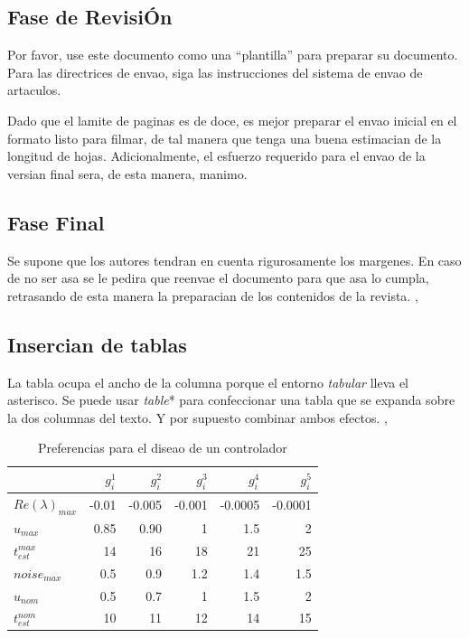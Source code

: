 \documentclass[5p,times,authoryear]{elsarticle}
\begin{document}
\subsection{Fase de RevisiÓn}

Por favor, use este documento como una ``plantilla'' para preparar su documento. Para las directrices de envao, siga las instrucciones del sistema de envao de artaculos.

Dado que el lamite de paginas es de doce, es mejor preparar el envao inicial en el formato listo para filmar, de tal manera que tenga una buena estimacian de la longitud de hojas. Adicionalmente, el esfuerzo requerido para el envao de la versian final sera, de esta manera, manimo.

\subsection{Fase Final}

Se supone que los autores tendran en cuenta rigurosamente los margenes. En caso de no ser asa se le pedira que reenvae el documento para que asa lo cumpla, retrasando de esta manera la preparacian de los contenidos de la revista. \citep{Bak:63a}, \citep{Bak:63b}

\subsection{Insercian de tablas}

La tabla ocupa el ancho de la columna porque el entorno \emph{tabular} lleva el asterisco. Se puede usar \emph{table}* para confeccionar una tabla que se expanda sobre la dos columnas del texto. Y por supuesto combinar ambos efectos. \citep{Heritage:92}, \citep{ChaRou:66}


\begin{table}[htbp]
  \caption{Preferencias para el diseao de un controlador}
   \label{extremos45}
  \begin{tabular*}{\hsize}{lrrrrr}
\hline
    & $g_i^1$ & $g_i^2$ & $g_i^3$ & $g_i^4$ & $g_i^5$ \\
    \hline
$Re(\lambda)_{max}$ & -0.01  & -0.005 & -0.001 & -0.0005 & -0.0001 \\
$u_{max}$& 0.85 & 0.90 & 1 & 1.5 & 2  \\
$t_{est}^{max}$& 14 & 16 & 18 & 21 & 25 \\
$noise_{max}$& 0.5 & 0.9 & 1.2 & 1.4 & 1.5  \\
$u_{nom}$& 0.5 & 0.7 & 1  & 1.5 & 2  \\
$t_{est}^{nom}$& 10 & 11 & 12 & 14 & 15 \\
\hline
  \end{tabular*}
\end{table}
\end{document}
